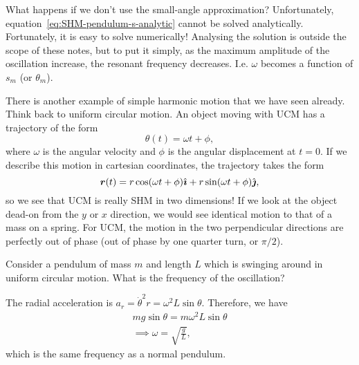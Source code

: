 \documentclass[../classical_mechanics.tex]{subfiles}
\begin{document}
        What happens if we don't use the small-angle approximation?
        Unfortunately, equation~\ref{eq:SHM-pendulum-s-analytic} cannot be solved analytically.
        Fortunately, it is easy to solve numerically!
        Analysing the solution is outside the scope of these notes, but to put it simply, as the maximum amplitude of the oscillation increase, the resonant frequency decreases.
        I.e. $\omega$ becomes a function of $s_m$ (or $\theta_m$).

        There is another example of simple harmonic motion that we have seen already.
        Think back to uniform circular motion.
        An object moving with UCM has a trajectory of the form
        \begin{equation}
            \theta(t)=\omega t+\phi,
        \end{equation}
        where $\omega$ is the angular velocity and $\phi$ is the angular displacement at $t=0$.
        If we describe this motion in cartesian coordinates, the trajectory takes the form
        \begin{equation}
            \boldsymbol{r}(t)=r\cos(\omega t+\phi)\hat{\boldsymbol{\imath}}+r\sin(\omega t+\phi)\hat{\boldsymbol{\jmath}},
        \end{equation}
        so we see that UCM is really SHM in two dimensions!
        If we look at the object dead-on from the $y$ or $x$ direction, we would see identical motion to that of a mass on a spring.
        For UCM, the motion in the two perpendicular directions are perfectly out of phase (out of phase by one quarter turn, or $\pi/2$).
        \begin{example}
            Consider a pendulum of mass $m$ and length $L$ which is swinging around in uniform circular motion.
            What is the frequency of the oscillation?

            The radial acceleration is $a_r=\dot{\theta}^2r=\omega^2L\sin\theta$.
            Therefore, we have
            \begin{gather}
                mg\sin\theta=m\omega^2L\sin\theta\\
                \implies\omega=\sqrt{\frac{g}{L}},
            \end{gather}
            which is the same frequency as a normal pendulum.
        \end{example}
\end{document}
